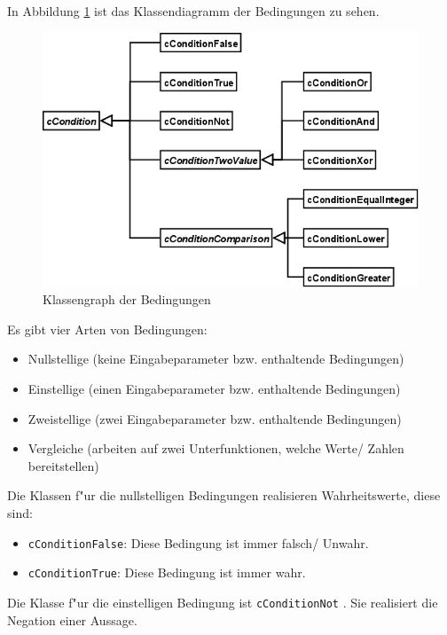 In Abbildung \ref{figClassConditions} ist das Klassendiagramm der Bedingungen zu sehen.

\begin{figure}[htbp]
\begin{center}
  \includegraphics[scale=0.4]{fib_conditions}
\end{center}
\caption{Klassengraph der Bedingungen}
\label{figClassConditions}
\end{figure}


\bigskip\noindent
Es gibt vier Arten von Bedingungen:
\begin{itemize}
 \item Nullstellige (keine Eingabeparameter bzw. enthaltende Bedingungen)
 \item Einstellige (einen Eingabeparameter bzw. enthaltende Bedingungen)
 \item Zweistellige (zwei Eingabeparameter bzw. enthaltende Bedingungen)
 \item Vergleiche (arbeiten auf zwei Unterfunktionen, welche Werte/ Zahlen bereitstellen)
\end{itemize}

\bigskip\noindent
Die Klassen f"ur die nullstelligen Bedingungen realisieren Wahrheitswerte, diese sind:
\begin{itemize}
 \item \verb|cConditionFalse|: Diese Bedingung ist immer falsch/ Unwahr.
 \item \verb|cConditionTrue|: Diese Bedingung ist immer wahr.
\end{itemize}

\bigskip\noindent
Die Klasse f"ur die einstelligen Bedingung ist \verb|cConditionNot| . Sie realisiert die Negation einer Aussage.

